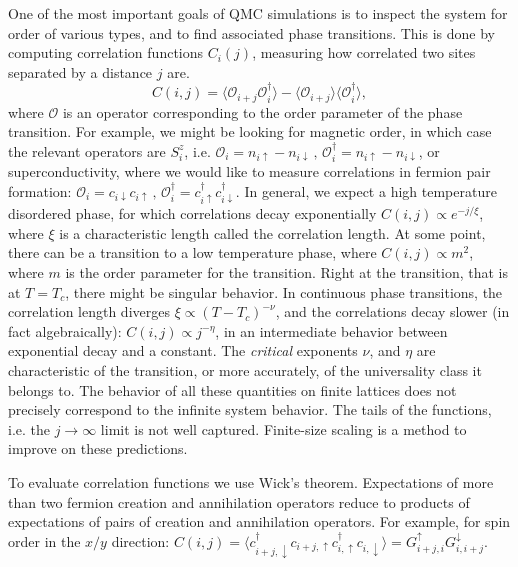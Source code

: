 One of the most important goals of QMC simulations is to inspect the system for order of various types, and to find  associated phase transitions. This is done by computing correlation functions $C_i (j) $, measuring how correlated two sites separated by a distance $j$ are.
\begin{equation}
C (i, j) = \big\langle \mathcal{O}_{i+j} \mathcal{O}_{i}^\dagger \big\rangle - \langle \mathcal{O}_{i+j} \big\rangle\big\langle\mathcal{O}_{i}^\dagger \big\rangle ,
\end{equation}
where $\mathcal{O}$ is an operator corresponding to the order parameter of the phase transition. For example, we might be looking for magnetic order, in which case the relevant operators are $S^z_i$, i.e. $\mathcal{O}_i = n_{i\uparrow} - n_{i\downarrow} \, , \, \mathcal{O}_i^\dagger = n_{i\uparrow} - n_{i\downarrow}$, or superconductivity, where we would like to measure correlations in fermion pair formation: $\mathcal{O}_i = c_{i\downarrow} c_{i\uparrow} \, , \, \mathcal{O}_i^\dagger = c_{i\uparrow}^\dagger c_{i\downarrow}^\dagger$.
In general, we expect a high temperature disordered phase, for which correlations decay exponentially $C (i, j) \propto e^{-j/\xi}$, where $\xi$ is a characteristic length called the correlation length. At some point, there can be a transition to a low temperature phase, where $C(i, j) \propto m^2$, where $m$ is the order parameter for the transition. Right at the transition, that is at $T = T_c$, there might be singular behavior. In continuous phase transitions, the correlation length diverges $\xi \propto (T-T_c)^{-\nu}$, and the correlations decay slower (in fact algebraically): $C(i, j) \propto j^{-\eta}$, in an intermediate behavior between exponential decay and a constant. The \emph{critical} exponents $\nu$, and $\eta$ are characteristic of the transition, or more accurately, of the universality class it belongs to.
The behavior of all these quantities on finite lattices does not precisely correspond to the infinite system behavior. The tails of the functions, i.e. the $j\rightarrow \infty$ limit is not well captured. Finite-size scaling is a method to improve on these predictions.

To evaluate correlation functions we use Wick's theorem. Expectations of more than two fermion creation and annihilation operators reduce to products of expectations of pairs of creation and annihilation operators. For example, for spin order in the $x/y$ direction:
$
C(i, j) = \big\langle c_{i+j, \downarrow}^\dagger c_{i+j, \uparrow} c_{i, \uparrow}^\dagger c_{i, \downarrow} \big\rangle = G_{i+j, i}^\uparrow G_{i, i + j}^\downarrow
$.

